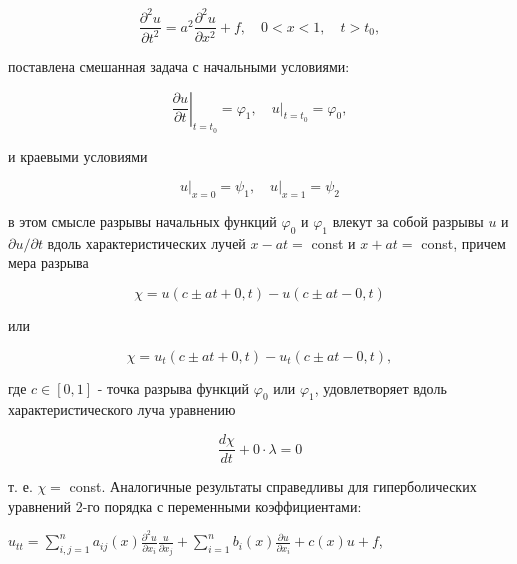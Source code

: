 \documentclass[10pt]{article}
\begin{document}
\[

\frac{\partial^{2} u}{\partial t^{2}}=a^{2} \frac{\partial^{2} u}{\partial x^{2}}+f, \quad 0<x<1, \quad t>t_{0},

\]



поставлена смешанная задача с начальными условиями:



\[

\left.\frac{\partial u}{\partial t}\right|_{t=t_{0}}=\varphi_{1},\left.\quad u\right|_{t=t_{0}}=\varphi_{0},

\]



и краевыми условиями



\[

\left.u\right|_{x=0}=\psi_{1},\left.\quad u\right|_{x=1}=\psi_{2}

\]



в этом смысле разрывы начальных функций $\varphi_{0}$ и $\varphi_{1}$ влекут за собой разрывы $u$ и $\partial u / \partial t$ вдоль характеристических лучей $x-a t=$ const и $x+a t=$ const, причем мера разрыва



\[

\chi=u(c \pm a t+0, t)-u(c \pm a t-0, t)

\]



или



\[

\chi=u_{t}(c \pm a t+0, t)-u_{t}(c \pm a t-0, t),

\]



где $c \in[0,1]$ - точка разрыва функций $\varphi_{0}$ или $\varphi_{1}$, удовлетворяет вдоль характеристического луча уравнению



\[

\frac{d \chi}{d t}+0 \cdot \lambda=0

\]



т. е. $\chi=$ const. Аналогичные результаты справедливы для гиперболических уравнений 2-го порядка с переменными коэффициентами:



$u_{t t}=\sum_{i, j=1}^{n} a_{i j}(x) \frac{\partial^{2} u}{\partial x_{i}} \frac{u}{\partial x_{j}}+\sum_{i=1}^{n} b_{i}(x) \frac{\partial u}{\partial x_{i}}+c(x) u+f$,
\end{document}
